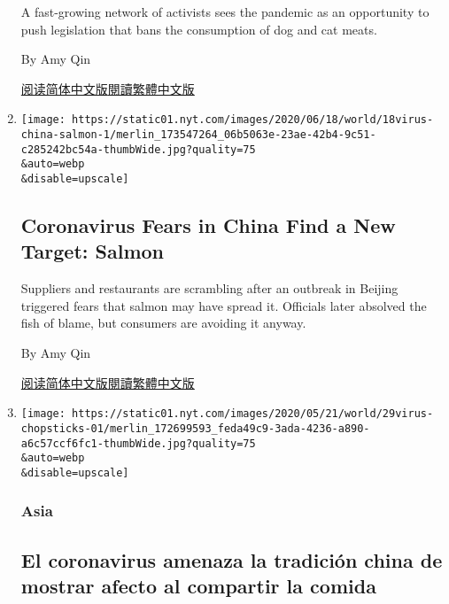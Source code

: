 \begin{enumerate}
  A fast-growing network of activists sees the pandemic as an
  opportunity to push legislation that bans the consumption of dog and
  cat meats.

  By Amy Qin

  \href{https://cn.nytimes.com/china/20200624/china-dog-meat/}{阅读简体中文版}\href{https://cn.nytimes.com/china/20200624/china-dog-meat/zh-hant/}{閱讀繁體中文版}
\item
  \href{/2020/06/18/world/asia/coronavirus-china-salmon.html}{}

  \texttt{[image: https://static01.nyt.com/images/2020/06/18/world/18virus-china-salmon-1/merlin\_173547264\_06b5063e-23ae-42b4-9c51-c285242bc54a-thumbWide.jpg?quality=75\\\&auto=webp\\\&disable=upscale]}

  \hypertarget{coronavirus-fears-in-china-find-a-new-target-salmon}{%
  \subsection{Coronavirus Fears in China Find a New Target:
  Salmon}\label{coronavirus-fears-in-china-find-a-new-target-salmon}}

  Suppliers and restaurants are scrambling after an outbreak in Beijing
  triggered fears that salmon may have spread it. Officials later
  absolved the fish of blame, but consumers are avoiding it anyway.

  By Amy Qin

  \href{https://cn.nytimes.com/china/20200619/coronavirus-china-salmon/}{阅读简体中文版}\href{https://cn.nytimes.com/china/20200619/coronavirus-china-salmon/zh-hant/}{閱讀繁體中文版}
\item
  \href{/es/2020/06/01/espanol/mundo/coronavirus-compartir-comida.html}{}

  \texttt{[image: https://static01.nyt.com/images/2020/05/21/world/29virus-chopsticks-01/merlin\_172699593\_feda49c9-3ada-4236-a890-a6c57ccf6fc1-thumbWide.jpg?quality=75\\\&auto=webp\\\&disable=upscale]}

  \hypertarget{asia}{%
  \subsubsection{Asia}\label{asia}}

  \hypertarget{el-coronavirus-amenaza-la-tradiciuxf3n-china-de-mostrar-afecto-al-compartir-la-comida}{%
  \subsection{El coronavirus amenaza la tradición china de mostrar
  afecto al compartir la
  comida}\label{el-coronavirus-amenaza-la-tradiciuxf3n-china-de-mostrar-afecto-al-compartir-la-comida}}


\end{enumerate}
